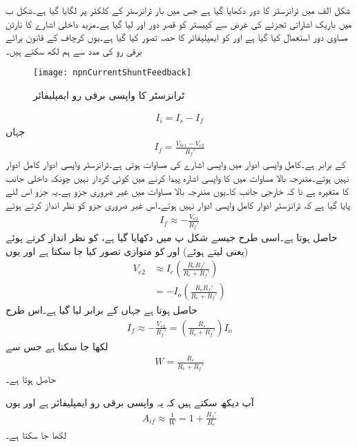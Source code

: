 شکل  الف میں ٹرانزسٹر کا دور دکھایا گیا ہے جس میں بار  ٹرانزسٹر  کے  کلکٹر  پر لگایا گیا ہے۔شکل  ب میں باریک اشاراتی تجزئے کی غرض سے کپیسٹر کو قصر دور اور  لیا گیا ہے۔مزید داخلی اشارے کا نارٹن مساوی دور استعمال کیا گیا ہے اور  کو ایمپلیفائر کا حصہ تصور کیا گیا ہے۔یوں کرچاف کے قانون برائے برقی رو کی مدد سے ہم لکھ سکتے ہیں۔
\begin{figure}
\centering
\texttt{[image: npnCurrentShuntFeedback]}
\caption{ٹرانزسٹر کا واپسی برقی رو ایمپلیفائر}
\label{شکل_واپسی_ٹرانزسٹر_برقی_رو_ایمپلیفائر}
\end{figure}
%
\begin{align*} \label{مساوات_واپسی_ٹرانزسٹر_برقی_رو_ایمپلیفائر_واپسی_مساوات}
I_i=I_s-I_f
\end{align*}
جہاں
\begin{align*}
I_f=\frac{V_{be1}-V_{e2}}{R_f'}
\end{align*}
کے برابر ہے۔کامل واپسی ادوار میں واپسی اشارے کی مساوات  ہوتی ہے۔ٹرانزسٹر واپسی ادوار کامل ادوار نہیں ہوتے۔مندرجہ بالا مساوات میں   کا واپسی اشارہ پیدا کرنے میں کوئی کردار نہیں چونکہ  داخلی جانب کا متغیرہ ہے نا کہ خارجی جانب کا۔یوں مندرجہ بالا مساوات میں  غیر ضروری جزو ہے۔یہ جزو اس لئے پایا گیا ہے کہ ٹرانزسٹر ادوار کامل واپسی ادوار نہیں ہوتے۔اس غیر ضروری جزو کو نظر انداز کرتے ہوئے 
\begin{align*}
I_f \approx -\frac{V_{e2}}{R_f'}
\end{align*}
حاصل ہوتا ہے۔اسی طرح جیسے شکل  پ میں دکھایا گیا ہے،  کو نظر انداز  کرتے ہوئے (یعنی  لیتے ہوئے)  اور  کو متوازی تصور کیا جا سکتا ہے اور یوں
\begin{align*}
V_{e2} &\approx I_e \left (\frac{R_e R_f'}{R_e+R_f'}\right )\\
&=-I_o \left ( \frac{R_e R_f'}{R_e+R_f'}\right )
\end{align*}
حاصل ہوتا ہے جہاں  کے برابر لیا گیا ہے۔اس طرح
\begin{align*}
I_f \approx -\frac{V_{e2}}{R_f'}=\left(\frac{R_e}{R_e+R_f'} \right) I_o
\end{align*}
لکھا جا سکتا ہے  جس سے
\begin{align*}
W =\frac{R_e}{R_e+R_f'}
\end{align*}
حاصل ہوتا ہے۔

آپ دیکھ سکتے ہیں کہ یہ واپسی برقی رو ایمپلیفائر ہے اور یوں
\begin{align}
A_{if} \approx \frac{1}{W}=1+\frac{R_f'}{R_e}
\end{align}
لکھا جا سکتا ہے۔

